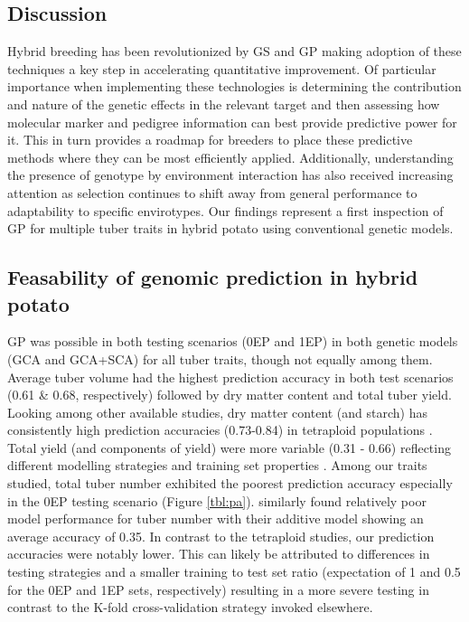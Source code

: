 \begin{refsection}
\section{Discussion}

Hybrid breeding has been revolutionized by GS and GP making adoption of these techniques a key step in accelerating quantitative improvement. Of particular importance when implementing these technologies is determining the contribution and nature of the genetic effects in the relevant target and then assessing how molecular marker and pedigree information can best provide predictive power for it. This in turn provides a roadmap for breeders to place these predictive methods where they can be most efficiently applied. Additionally, understanding the presence of genotype by environment interaction has also received increasing attention as selection continues to shift away from general performance to adaptability to specific envirotypes. Our findings represent a first inspection of GP for multiple tuber traits in hybrid potato using conventional genetic models.

\subsection{Feasability of genomic prediction in hybrid potato}

GP was possible in both testing scenarios (0EP and 1EP) in both genetic models (GCA and GCA+SCA) for all tuber traits, though not equally among them. Average tuber volume had the highest prediction accuracy in both test scenarios (0.61 \& 0.68, respectively) followed by dry matter content and total tuber yield. Looking among other available studies, dry matter content (and starch) has consistently high prediction accuracies (0.73-0.84) in tetraploid populations \parencite{Sverrisdottir2018, Cuevas2022, Ortiz2022}. Total yield (and components of yield) were more variable (0.31 - 0.66) reflecting different modelling strategies and training set properties \parencite{Ortiz2022, Wilson2021}. Among our traits studied, total tuber number exhibited the poorest prediction accuracy especially in the 0EP testing scenario (Figure \ref{tbl:pa}). \parencite{Wilson2021} similarly found relatively poor model performance for tuber number with their additive model showing an average accuracy of 0.35. In contrast to the tetraploid studies, our prediction accuracies were notably lower. This can likely be attributed to differences in testing strategies and a smaller training to test set ratio (expectation of 1 and 0.5 for the 0EP and 1EP sets, respectively) resulting in a more severe testing in contrast to the K-fold cross-validation strategy invoked elsewhere.


\end{refsection}
